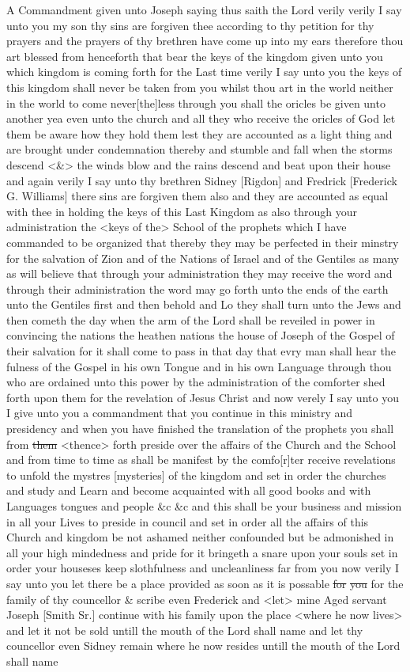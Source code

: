 				A Commandment given unto Joseph saying thus saith the Lord verily verily I say unto you my son thy sins are forgiven thee according to thy petition for thy prayers and the prayers of thy brethren have come up into my ears therefore thou art blessed from henceforth that bear the keys of the kingdom given unto you which kingdom is coming forth for the Last time verily I say unto you the keys of this kingdom shall never be taken from you whilst thou art in the world neither in the world to come never[the]less through you shall the oricles be given unto another yea even unto the church and all they who receive the oricles of God let them be aware how they hold them lest they are accounted as a light thing and are brought under condemnation thereby and stumble and fall when the storms descend <\&> the winds blow and the rains descend and beat upon their house and again verily I say unto thy brethren Sidney [Rigdon] and Fredrick [Frederick G. Williams] there sins are forgiven them also and they are accounted as equal with thee in holding the keys of this Last Kingdom as also through your administration the <keys of the> School of the prophets which I have commanded to be organized that thereby they may be perfected in their minstry for the salvation of Zion and of the Nations of Israel and of the Gentiles as many as will believe that through your administration they may receive the word and through their administration the word may go forth unto the ends of the earth unto the Gentiles first and then behold and Lo they shall turn unto the Jews and then cometh the day when the arm of the Lord shall be reveiled in power in convincing the nations the heathen nations the house of Joseph of the Gospel of their salvation for it shall come to pass in that day that evry man shall hear the fulness of the Gospel in his own Tongue and in his own Language through thou who are ordained unto this power by the administration of the comforter shed forth upon them for the revelation of Jesus Christ and now verely I say unto you I give unto you a commandment that you continue in this ministry and presidency and when you have finished the translation of the prophets you shall from \sout{them} <thence> forth preside over the affairs of the Church and the School and from time to time as shall be manifest by the comfo[r]ter receive revelations to unfold the mystres [mysteries] of the kingdom and set in order the churches and study and Learn and become acquainted with all good books and with Languages tongues and people \&c \&c and this shall be your business and mission in all your Lives to preside in council and set in order all the affairs of this Church and kingdom be not ashamed neither confounded but be admonished in all your high mindedness and pride for it bringeth a snare upon your souls set in order your houseses keep slothfulness and uncleanliness far from you now verily I say unto you let there be a place provided as soon as it is possable \sout{for} \sout{you} for the family of thy councellor \& scribe even Frederick and <let> mine Aged servant Joseph [Smith Sr.] continue with his family upon the place <where he now lives> and let it not be sold untill the mouth of the Lord shall name and let thy councellor even Sidney remain where he now resides untill the mouth of the Lord shall name 